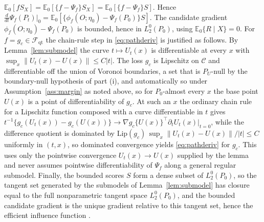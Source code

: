 \documentclass[11pt]{article}
\newcommand{\E}{\mathbb E}
\newcommand{\calC}{\mathcal C}
\newcommand{\calF}{\mathcal F}
\newcommand{\norm}[1]{\lVert #1\rVert}
\begin{document}
$\E_0[fS_X]=\E_0[\{f-\Psi_f\}S_X]=\E_0[\{f-\Psi_f\}S]$. Hence $\frac{d}{dt}\Psi_f(P_t)|_0=\E_0[\{\phi_f(O;\eta_0)-\Psi_f(P_0)\}S]$. The candidate gradient $\phi_f(O;\eta_0)-\Psi_f(P_0)$ is bounded, hence in $L_2^0(P_0)$, using $\E_0\{R\mid X\}=0$. For $f=g_c\in\calF_{\mathrm{qt}}$ the chain-rule step in \eqref{eq:pathderiv} is justified as follows. By Lemma~\ref{lem:submodel} the curve $t\mapsto U_t(x)$ is differentiable at every $x$ with $\sup_x\norm{U_t(x)-U(x)}\le C|t|$. The loss $g_c$ is Lipschitz on $\calC$ and differentiable off the union of Voronoi boundaries, a set that is $P_U$-null by the boundary-null hypothesis of part (i), and automatically so under Assumption~\ref{ass:margin} as noted above, so for $P_0$-almost every $x$ the base point $U(x)$ is a point of differentiability of $g_c$. At such an $x$ the ordinary chain rule for a Lipschitz function composed with a curve differentiable in $t$ gives $t^{-1}\{g_c(U_t(x))-g_c(U(x))\}\to\nabla g_c\{U(x)\}^\top\partial_tU_t(x)|_{t=0}$, while the difference quotient is dominated by $\mathrm{Lip}(g_c)\,\sup_x\norm{U_t(x)-U(x)}/|t|\le C$ uniformly in $(t,x)$, so dominated convergence yields \eqref{eq:pathderiv} for $g_c$. This uses only the pointwise convergence $U_t(x)\to U(x)$ supplied by the lemma and never assumes pointwise differentiability of $\Psi_f$ along a general regular submodel. Finally, the bounded scores $S$ form a dense subset of $L_2^0(P_0)$, so the tangent set generated by the submodels of Lemma~\ref{lem:submodel} has closure equal to the full nonparametric tangent space $L_2^0(P_0)$, and the bounded candidate gradient is the unique gradient relative to this tangent set, hence the efficient influence function \citep[Section~25.3]{vandervaart1998}.
\end{document}
